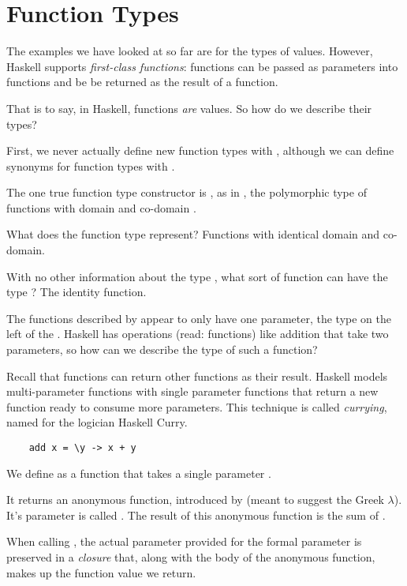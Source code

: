 \section{Function Types}

\begin{notelist}
    \item The examples we have looked at so far are for the types of values. However, Haskell supports
          \textit{first-class functions}: functions can be passed as parameters into functions and be
          be returned as the result of a function.
    \item That is to say, in Haskell, functions \textit{are} values. So how do we describe their types?
    \item First, we never actually define new function types with , although we can define
          synonyms for function types with .
    \item The one true function type constructor is \code{->}, as in , the polymorphic
          type of functions with domain  and co-domain .
    \begin{notelist}
        \item What does the function type  represent? Functions with identical domain and co-domain.
        \item With no other information about the type , what sort of function can have
              the type ? The identity function.
    \end{notelist}
    \item The functions described by \code{->} appear to only have one parameter, the type on the 
          left of the \code{->}. Haskell has operations (read: functions) like addition that take two parameters,
          so how can we describe the type of such a function?
    \item Recall that functions can return other functions as their result. Haskell models multi-parameter
          functions with single parameter functions that return a new function ready to consume more parameters.
          This technique is called \textit{currying}, named for the logician Haskell Curry.
    \begin{lstlisting} 
    add x = \y -> x + y
    \end{lstlisting} 
    \begin{notelist}
        \item We define  as a function that takes a single parameter .
        \item It returns an anonymous function, introduced by \code{\\} (meant to suggest the Greek $\lambda$).
              It's parameter is called . The result of this anonymous function is the sum of . 
        \item When calling , the actual parameter provided for the formal parameter  is preserved
              in a \textit{closure} that, along with the body of the anonymous function, makes up the
              function value we return.
    \end{notelist}
    

\end{notelist}
